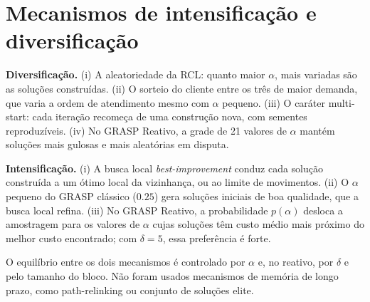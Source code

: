 \section{Mecanismos de intensificação e diversificação}

\textbf{Diversificação.} (i) A aleatoriedade da RCL: quanto maior $\alpha$, mais variadas são as soluções construídas. (ii) O sorteio do cliente entre os três de maior demanda, que varia a ordem de atendimento mesmo com $\alpha$ pequeno. (iii) O caráter multi-start: cada iteração recomeça de uma construção nova, com sementes reproduzíveis. (iv) No GRASP Reativo, a grade de 21 valores de $\alpha$ mantém soluções mais gulosas e mais aleatórias em disputa.

\textbf{Intensificação.} (i) A busca local \textit{best-improvement} conduz cada solução construída a um ótimo local da vizinhança, ou ao limite de movimentos. (ii) O $\alpha$ pequeno do GRASP clássico ($0.25$) gera soluções iniciais de boa qualidade, que a busca local refina. (iii) No GRASP Reativo, a probabilidade $p(\alpha)$ desloca a amostragem para os valores de $\alpha$ cujas soluções têm custo médio mais próximo do melhor custo encontrado; com $\delta=5$, essa preferência é forte.

O equilíbrio entre os dois mecanismos é controlado por $\alpha$ e, no reativo, por $\delta$ e pelo tamanho do bloco. Não foram usados mecanismos de memória de longo prazo, como path-relinking ou conjunto de soluções elite.
